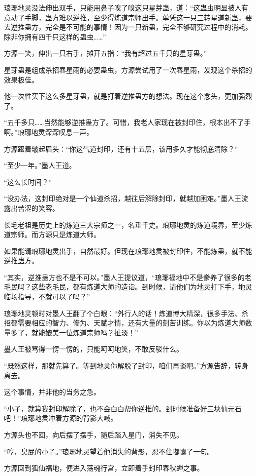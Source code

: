 \begin{this_body}
琅琊地灵没法伸出双手，只能用鼻子嗅了嗅这只星芽蛊，道：“这蛊虫明显被人有意动了手脚，蛊方难以逆推，至少得炼道宗师出手。单凭这一只三转星道新蛊，要去逆推蛊方，完全是不可能的事情！因为一只新蛊，完全不够研究过程中的消耗。除非你拥有四千只这样的蛊虫……”

方源一笑，伸出一只右手，摊开五指：“我有超过五千只的星芽蛊。”

星芽蛊是组成杀招春星雨的必要蛊虫，方源尝试用了一次春星雨，发现这个杀招的效果极佳。

他一次性买下这么多星芽蛊，就是打着逆推蛊方的想法。现在这个念头，更加强烈了。

“五千多只……当然能够逆推蛊方了。可惜，我老人家现在被封印住，根本出不了手啊。”琅琊地灵深深叹息一声。

方源跟着皱起眉头：“你这气道封印，还有十五层，该用多久才能彻底清除？”

“至少一年。”墨人王道。

“这么长时间？”

“没办法，这封印绝对是一个仙道杀招，越往后解除封印，就越加困难。”墨人王流露出苦涩的笑容。

长毛老祖是历史上的炼道三大宗师之一，名垂千史。琅琊地灵的炼道境界，至少炼道宗师。而方源只是炼道大师。

如果能请琅琊地灵出手，自然最好。但现在琅琊地灵被封印住，不能炼蛊，就不能逆推蛊方。

“其实，逆推蛊方也不是不可以。”墨人王提议道，“琅琊福地中不是豢养了很多的老毛民吗？这些老毛民，都有炼道大师的造诣。到时候，请他们为地灵打下手，地灵临场指导，不就可以了吗？”

琅琊地灵顿时对墨人王翻了个白眼：“外行人的话！炼道博大精深，很多手法、杀招都需要相应的智力、修为、天赋才情，还有大量的刻苦训练。你以为炼道大师数量多了，就能媲美一位炼道宗师吗？扯淡！”

墨人王被骂得一愣一愣的，只能呵呵地笑，不敢反驳什么。

“既然这样，那就先算了。等到地灵你解脱了封印，咱们再谈吧。”方源告辞，转身离去。

这个事情，并非他的当务之急。

“小子，就算我封印解除了，也不会白白帮你逆推的。到时候准备好三块仙元石吧！”琅琊地灵冲着方源的背影大喊。

方源头也不回，向后摆了摆手，随后踏入星门，消失不见。

“哼，臭屁的小子。”琅琊地灵望着他消失的背影，忍不住嘟囔了一句。

方源回到狐仙福地，便进入荡魂行宫，立即着手封印春秋蝉之事。


\end{this_body}
